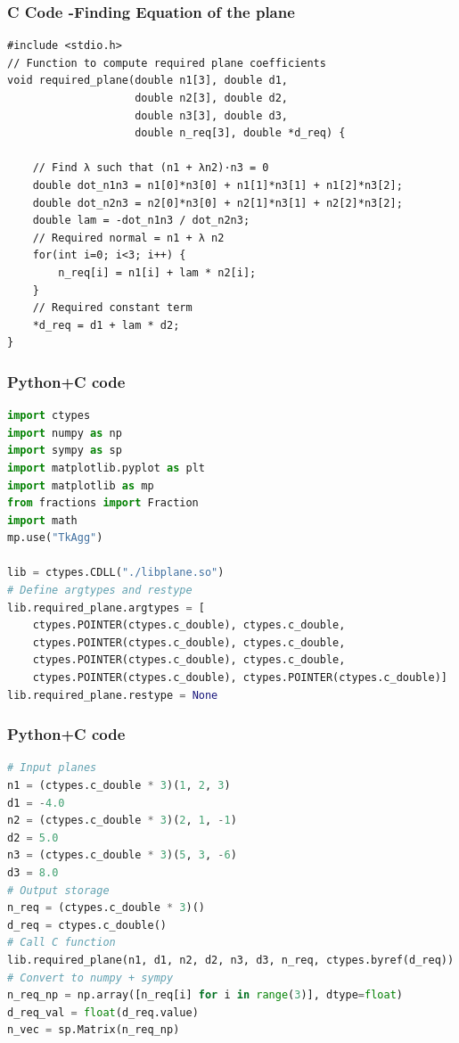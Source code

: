 \documentclass{beamer}
\begin{document}
\begin{frame}[fragile]
    \frametitle{C Code -Finding Equation of the plane}

    \begin{lstlisting}
#include <stdio.h>
// Function to compute required plane coefficients
void required_plane(double n1[3], double d1,
                    double n2[3], double d2,
                    double n3[3], double d3,
                    double n_req[3], double *d_req) {
    
    // Find λ such that (n1 + λn2)·n3 = 0
    double dot_n1n3 = n1[0]*n3[0] + n1[1]*n3[1] + n1[2]*n3[2];
    double dot_n2n3 = n2[0]*n3[0] + n2[1]*n3[1] + n2[2]*n3[2];
    double lam = -dot_n1n3 / dot_n2n3;
    // Required normal = n1 + λ n2
    for(int i=0; i<3; i++) {
        n_req[i] = n1[i] + lam * n2[i];
    }
    // Required constant term
    *d_req = d1 + lam * d2;
}

    \end{lstlisting}
\end{frame}

\begin{frame}[fragile]
    \frametitle{Python+C code}

    \begin{lstlisting}[language=Python]
import ctypes
import numpy as np
import sympy as sp
import matplotlib.pyplot as plt
import matplotlib as mp
from fractions import Fraction
import math
mp.use("TkAgg")

lib = ctypes.CDLL("./libplane.so")
# Define argtypes and restype
lib.required_plane.argtypes = [
    ctypes.POINTER(ctypes.c_double), ctypes.c_double,
    ctypes.POINTER(ctypes.c_double), ctypes.c_double,
    ctypes.POINTER(ctypes.c_double), ctypes.c_double,
    ctypes.POINTER(ctypes.c_double), ctypes.POINTER(ctypes.c_double)]
lib.required_plane.restype = None

    \end{lstlisting}
\end{frame}

\begin{frame}[fragile]
    \frametitle{Python+C code}

    \begin{lstlisting}[language=Python]
# Input planes
n1 = (ctypes.c_double * 3)(1, 2, 3)
d1 = -4.0
n2 = (ctypes.c_double * 3)(2, 1, -1)
d2 = 5.0
n3 = (ctypes.c_double * 3)(5, 3, -6)
d3 = 8.0
# Output storage
n_req = (ctypes.c_double * 3)()
d_req = ctypes.c_double()
# Call C function
lib.required_plane(n1, d1, n2, d2, n3, d3, n_req, ctypes.byref(d_req))
# Convert to numpy + sympy
n_req_np = np.array([n_req[i] for i in range(3)], dtype=float)
d_req_val = float(d_req.value)
n_vec = sp.Matrix(n_req_np)

    \end{lstlisting}
\end{frame}
\end{document}
